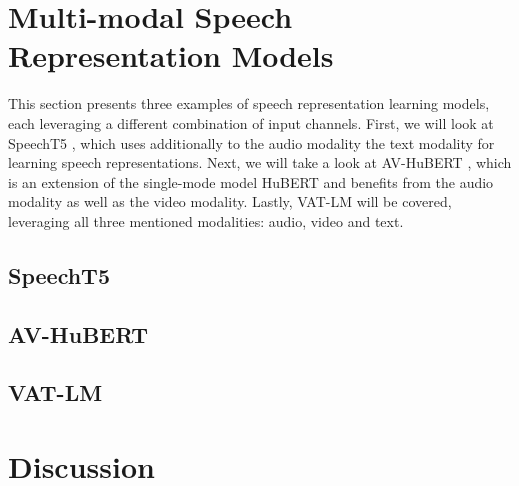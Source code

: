 \documentclass[11pt]{article}
\begin{document}
\section{Multi-modal Speech Representation Models}
This section presents three examples of speech representation learning models, each leveraging a different combination of input channels. First, we will look at SpeechT5 \cite{speecht5}, which uses additionally to the audio modality the text modality for learning speech representations. Next, we will take a look at AV-HuBERT \cite{AV_HuBERT}, which is an extension of the single-mode model HuBERT \cite{hubert} and benefits from the audio modality as well as the video modality. Lastly, VAT-LM \cite{vatlm} will be covered, leveraging all three mentioned modalities: audio, video and text.
\subsection{SpeechT5}\label{sec:speecht5}

\subsection{AV-HuBERT}\label{sec:av-hubert}

\subsection{VAT-LM}

\section{Discussion}





\end{document}
